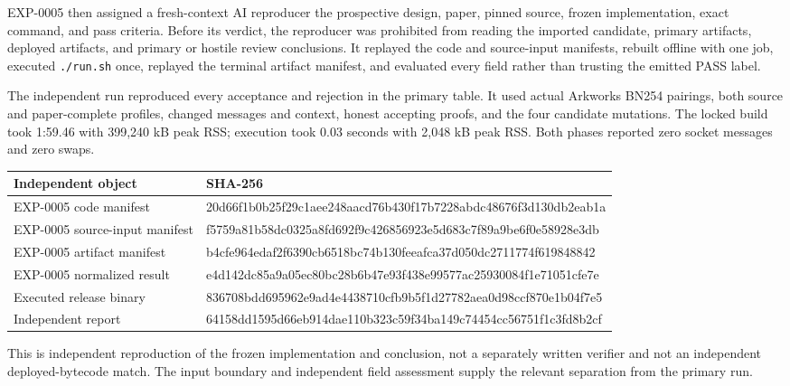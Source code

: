 \documentclass[10pt,a4paper]{article}
\begin{document}
EXP-0005 then assigned a fresh-context AI reproducer the prospective design,
paper, pinned source, frozen implementation, exact command, and pass criteria.
Before its verdict, the reproducer was prohibited from reading the imported
candidate, primary artifacts, deployed artifacts, and primary or hostile
review conclusions. It replayed the code and source-input manifests, rebuilt
offline with one job, executed \texttt{./run.sh} once, replayed the terminal
artifact manifest, and evaluated every field rather than trusting the emitted
PASS label.

The independent run reproduced every acceptance and rejection in the primary
table. It used actual Arkworks BN254 pairings, both source and paper-complete
profiles, changed messages and context, honest accepting proofs, and the four
candidate mutations. The locked build took 1:59.46 with 399,240 kB peak RSS;
execution took 0.03 seconds with 2,048 kB peak RSS. Both phases reported zero
socket messages and zero swaps.

\begin{center}
\begin{tabularx}{\textwidth}{@{}lX@{}}
\toprule
Independent object & SHA-256 \\
\midrule
EXP-0005 code manifest &
\ttfamily\scriptsize 20d66f1b0b25f29c1aee248aacd76b430f17b7228abdc48676f3d130db2eab1a \\
EXP-0005 source-input manifest &
\ttfamily\scriptsize f5759a81b58dc0325a8fd692f9c426856923e5d683c7f89a9be6f0e58928e3db \\
EXP-0005 artifact manifest &
\ttfamily\scriptsize b4cfe964edaf2f6390cb6518bc74b130feeafca37d050dc2711774f619848842 \\
EXP-0005 normalized result &
\ttfamily\scriptsize e4d142dc85a9a05ec80bc28b6b47e93f438e99577ac25930084f1e71051cfe7e \\
Executed release binary &
\ttfamily\scriptsize 836708bdd695962e9ad4e4438710cfb9b5f1d27782aea0d98ccf870e1b04f7e5 \\
Independent report &
\ttfamily\scriptsize 64158dd1595d66eb914dae110b323c59f34ba149c74454cc56751f1c3fd8b2cf \\
\bottomrule
\end{tabularx}
\end{center}

This is independent reproduction of the frozen implementation and conclusion,
not a separately written verifier and not an independent deployed-bytecode
match. The input boundary and independent field assessment supply the relevant
separation from the primary run.
\end{document}
